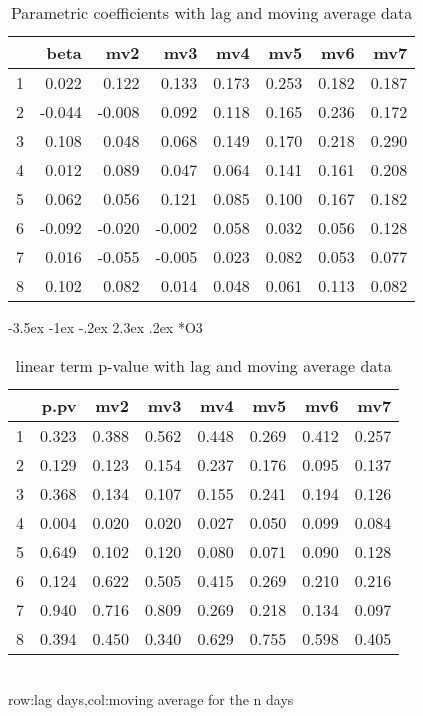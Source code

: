 \documentclass[a4paper, 12pt]{article}
\makeatletter
\def\large{\fontsize{14}{20}\selectfont}
\renewcommand\subsection{\@startsection {subsection}{1}{\z@}%
                                   {-3.5ex \@plus -1ex \@minus -.2ex}%
                                   {2.3ex \@plus.2ex}%
                                   {\centering\normalfont\large\bfseries}}
\makeatother
\begin{document}
\begin{table}[h]
\centering
\caption{Parametric coefficients with lag and moving average data}
\begin{tabular}{rrrrrrrr}
  \hline
 & beta & mv2 & mv3 & mv4 & mv5 & mv6 & mv7 \\
  \hline
1 & 0.022 & 0.122 & 0.133 & 0.173 & 0.253 & 0.182 & 0.187 \\
  2 & -0.044 & -0.008 & 0.092 & 0.118 & 0.165 & 0.236 & 0.172 \\
  3 & 0.108 & 0.048 & 0.068 & 0.149 & 0.170 & 0.218 & 0.290 \\
  4 & 0.012 & 0.089 & 0.047 & 0.064 & 0.141 & 0.161 & 0.208 \\
  5 & 0.062 & 0.056 & 0.121 & 0.085 & 0.100 & 0.167 & 0.182 \\
  6 & -0.092 & -0.020 & -0.002 & 0.058 & 0.032 & 0.056 & 0.128 \\
  7 & 0.016 & -0.055 & -0.005 & 0.023 & 0.082 & 0.053 & 0.077 \\
  8 & 0.102 & 0.082 & 0.014 & 0.048 & 0.061 & 0.113 & 0.082 \\
   \hline
\end{tabular}
\end{table}
\clearpage
\subsection*{O3}
\begin{table}[h]
\centering
\caption{linear term p-value with lag and moving average data}
\begin{tabular}{rrrrrrrr}
  \hline
 & p.pv & mv2 & mv3 & mv4 & mv5 & mv6 & mv7 \\
  \hline
1 & 0.323 & 0.388 & 0.562 & 0.448 & 0.269 & 0.412 & 0.257 \\
  2 & 0.129 & 0.123 & 0.154 & 0.237 & 0.176 & 0.095 & 0.137 \\
  3 & 0.368 & 0.134 & 0.107 & 0.155 & 0.241 & 0.194 & 0.126 \\
  4 & 0.004 & 0.020 & 0.020 & 0.027 & 0.050 & 0.099 & 0.084 \\
  5 & 0.649 & 0.102 & 0.120 & 0.080 & 0.071 & 0.090 & 0.128 \\
  6 & 0.124 & 0.622 & 0.505 & 0.415 & 0.269 & 0.210 & 0.216 \\
  7 & 0.940 & 0.716 & 0.809 & 0.269 & 0.218 & 0.134 & 0.097 \\
  8 & 0.394 & 0.450 & 0.340 & 0.629 & 0.755 & 0.598 & 0.405 \\
   \hline
\end{tabular}
\\row:lag days,col:moving average for the n days
\end{table}
\end{document}

